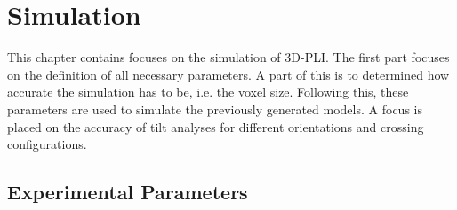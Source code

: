 \setcounter{chapter}{7}
\chapter{Simulation}
\label{cha:simulation_analysis}
% 
% 
% 
This chapter contains focuses on the simulation of \ac{3D-PLI}.
The first part focuses on the definition of all necessary parameters.
A part of this is to determined how accurate the simulation has to be, i.e. the voxel size.
Following this, these parameters are used to simulate the previously generated models.
A focus is placed on the accuracy of tilt analyses for different orientations and crossing configurations.
% 
% 
% 
% 
% 
% 
\section{Experimental Parameters}\label{sec:sim_choose_parameters}
% 
